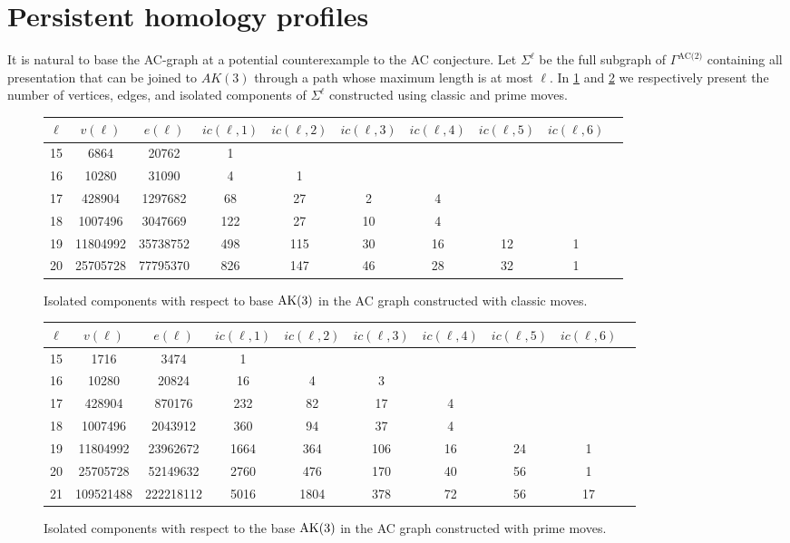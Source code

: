 
\section{Persistent homology profiles}

It is natural to base the AC-graph at a potential counterexample to the AC conjecture.
Let \(\Sigma^\ell\) be the full subgraph of \(\Gamma^{\text{AC(2)}}\) containing all presentation that can be joined to \(AK(3)\) through a path whose maximum length is at most \(\ell\).
In \cref{fig:ak_classic_persistence} and \cref{fig:ak_prime_persistence} we respectively present the number of vertices, edges, and isolated components of \(\Sigma^\ell\) constructed using classic and prime moves.

\begin{figure}
	\begin{tabular}{|c|c|c|c|c|c|c|c|c|c|}
		\hline
		$\ell$ & $v(\ell)$ & $e(\ell)$ & $ic(\ell,1)$ & $ic(\ell,2)$ & $ic(\ell,3)$ & $ic(\ell,4)$ & $ic(\ell,5)$ & $ic(\ell,6)$ \\ \hline
		15 & 6864 & 20762 & 1 &  &  &  &  &  \\ \hline
		16 & 10280 & 31090 & 4 & 1 &  &  &  &  \\ \hline
		17 & 428904 & 1297682 & 68 & 27 & 2 & 4 &  &  \\ \hline
		18 & 1007496 & 3047669 & 122 & 27 & 10 & 4 &  &  \\ \hline
		19 & 11804992 & 35738752 & 498 & 115 & 30 & 16 & 12 & 1 \\ \hline
		20 & 25705728 & 77795370 & 826 & 147 & 46 & 28 & 32 & 1 \\ \hline
	\end{tabular}
	\caption{Isolated components with respect to base \(\text{AK}(3)\) in the AC graph constructed with classic moves.}
	\label{fig:ak_classic_persistence}
\end{figure}

\begin{figure}
	\begin{tabular}{|c|c|c|c|c|c|c|c|c|c|}
		\hline
		$\ell$ & $v(\ell)$ & $e(\ell)$ & $ic(\ell,1)$ & $ic(\ell,2)$ & $ic(\ell,3)$ & $ic(\ell,4)$ & $ic(\ell,5)$ & $ic(\ell,6)$ \\ \hline
		15 & 1716 & 3474 & 1 &  &  &  &  &  \\ \hline
		16 & 10280 & 20824 & 16 & 4 & 3 &  &  &  \\ \hline
		17 & 428904 & 870176 & 232 & 82 & 17 & 4 &  &  \\ \hline
		18 & 1007496 & 2043912 & 360 & 94 & 37 & 4 &  &  \\ \hline
		19 & 11804992 & 23962672 & 1664 & 364 & 106 & 16 & 24 & 1 \\ \hline
		20 & 25705728 & 52149632 & 2760 & 476 & 170 & 40 & 56 & 1 \\ \hline
		21 & 109521488 & 222218112 & 5016 & 1804 & 378 & 72 & 56 & 17 \\ \hline
	\end{tabular}
	\caption{Isolated components with respect to the base \(\text{AK}(3)\) in the AC graph constructed with prime moves.}
	\label{fig:ak_prime_persistence}
\end{figure}